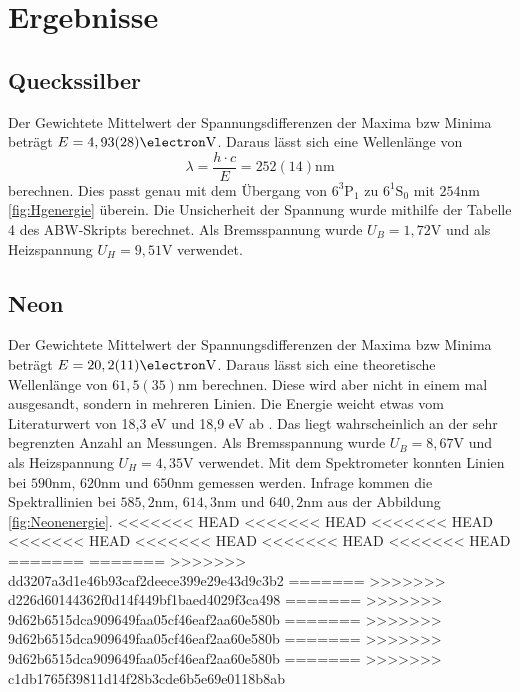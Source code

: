 \documentclass[11pt, a4paper]{article}
\begin{document}
    \section{Ergebnisse}

    \subsection{Queckssilber}

    Der Gewichtete Mittelwert der Spannungsdifferenzen der Maxima bzw Minima beträgt $E = 4,93(28) \si{\electron\volt}$. Daraus lässt sich eine Wellenlänge von 
    \begin{equation}
        \lambda = \frac{h \cdot c}{E} = 252(14) \si{\nano\meter}
    \end{equation}
    berechnen. Dies passt genau mit dem Übergang von $6^3\text{P}_1$ zu $6^1\text{S}_0$ mit $254 \si{\nano\meter}$ \ref{fig:Hgenergie} überein.
    Die Unsicherheit der Spannung wurde mithilfe der Tabelle 4 des ABW-Skripts \cite{ABW} berechnet. Als Bremsspannung wurde $U_B = 1,72 \si{\volt}$ und als Heizspannung $U_H = 9,51 \si{\volt}$ verwendet.

    \subsection{Neon}

    Der Gewichtete Mittelwert der Spannungsdifferenzen der Maxima bzw Minima beträgt $E = 20,2(11) \si{\electron\volt}$. Daraus lässt sich eine theoretische Wellenlänge von $61,5(35) \si{\nano\meter}$ berechnen. Diese wird aber nicht in einem mal ausgesandt, sondern in mehreren Linien. Die Energie weicht etwas vom Literaturwert von 18,3 eV und 18,9 eV ab \cite{FHV}. Das liegt wahrscheinlich an der sehr begrenzten Anzahl an Messungen.
    Als Bremsspannung wurde $U_B = 8,67 \si{\volt}$ und als Heizspannung $U_H = 4,35 \si{\volt}$ verwendet.
    Mit dem Spektrometer konnten Linien bei $590 \si{\nano\meter}$, $620 \si{\nano\meter}$ und $650 \si{\nano\meter}$ gemessen werden. Infrage kommen die Spektrallinien bei $585,2 \si{\nano\meter}$, $614,3 \si{\nano\meter}$ und $640,2 \si{\nano\meter}$ aus der Abbildung \ref{fig:Neonenergie}.
<<<<<<< HEAD
<<<<<<< HEAD
<<<<<<< HEAD
<<<<<<< HEAD
<<<<<<< HEAD
<<<<<<< HEAD
<<<<<<< HEAD
=======
=======
>>>>>>> dd3207a3d1e46b93caf2deece399e29e43d9c3b2
=======
>>>>>>> d226d60144362f0d14f449bf1baed4029f3ca498
=======
>>>>>>> 9d62b6515dca909649faa05cf46eaf2aa60e580b
=======
>>>>>>> 9d62b6515dca909649faa05cf46eaf2aa60e580b
=======
>>>>>>> 9d62b6515dca909649faa05cf46eaf2aa60e580b
=======
>>>>>>> c1db1765f39811d14f28b3cde6b5e69e0118b8ab
\end{document}
